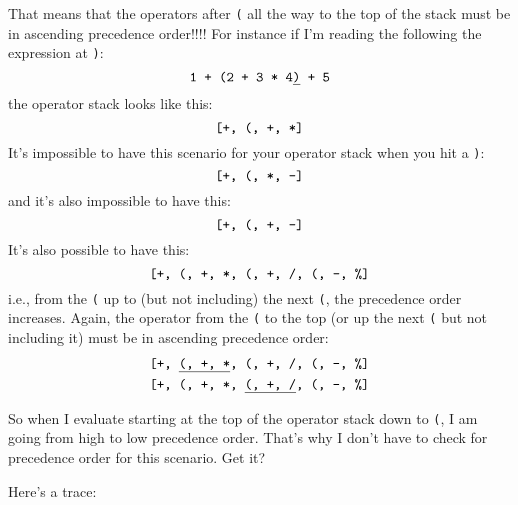 That means that
the operators after \texttt{(} all the way to the top of the stack
must be in ascending precedence order!!!!
For instance if I'm reading the following the expression
at \verb!)!:
\[
\text{\texttt{1 + (2 + 3 * 4\underline{)} + 5}}
\]
the operator stack looks like this:
\[
\text{\texttt{[+, (, +, *]}}
\]
It's impossible to have this scenario for your operator stack
when you hit a \verb!)!:
\[
\text{\texttt{[+, (, *, -]}}
\]
and it's also impossible to have this:
\[
\text{\texttt{[+, (, +, -]}}
\]
It's also possible to have this:
\[
\text{\texttt{[+, (, +, *, (, +, /, (, -, \%]}}
\]
i.e., from the \texttt{(} up to (but not including) the next \texttt{(},
the precedence order increases.
Again, the operator from the \texttt{(} to the top
(or up the next \texttt{(} but not including it)
must be in ascending precedence order:
\begin{align*}
&\text{\texttt{[+, \underline{(, +, *}, (, +, /, (, -, \%]}} \\
&\text{\texttt{[+, (, +, *, \underline{(, +, /}, (, -, \%]}}
\end{align*}


So when I evaluate starting at the top of the operator
stack down to \texttt{(}, I am going from high to low precedence order.
That's why I don't have to check for precedence order for this scenario.
Get it?

Here's a trace:

